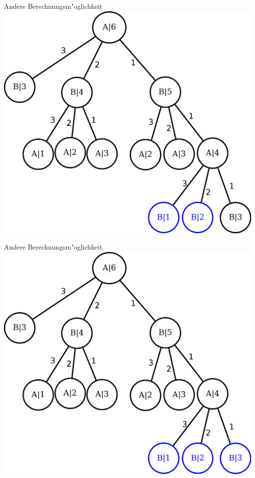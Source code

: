 \documentclass[18pt]{beamer}
\begin{document}
\begin{frame}{Andere Berechnungsm"oglichkeit}
\includegraphics[scale=0.55]{baum11.png}
\end{frame}

\begin{frame}{Andere Berechnungsm"oglichkeit}
\includegraphics[scale=0.55]{baum12.png}
\end{frame}
\end{document}
